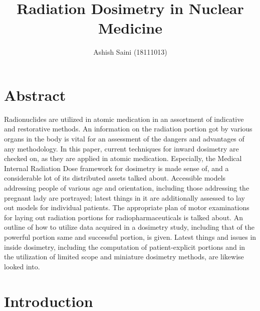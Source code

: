 \documentclass[12pt]{article}
\begin{document}
\title{Radiation Dosimetry in Nuclear Medicine}
\author{Ashish Saini (18111013)}

\maketitle

\section{Abstract} 
Radionuclides are utilized in atomic medication in an assortment of indicative and restorative methods. An information on the radiation portion got by various organs in the body is vital for an assessment of the dangers and advantages of any methodology. In this paper, current techniques for inward dosimetry are checked on, as they are applied in atomic medication. Especially, the Medical Internal Radiation Dose framework for dosimetry is made sense of, and a considerable lot of its distributed assets talked about. Accessible models addressing people of various age and orientation, including those addressing the pregnant lady are portrayed; latest things in it are additionally assessed to lay out models for individual patients. The appropriate plan of motor examinations for laying out radiation portions for radiopharmaceuticals is talked about. An outline of how to utilize data acquired in a dosimetry study, including that of the powerful portion same and successful portion, is given. Latest things and issues in inside dosimetry, including the computation of patient-explicit portions and in the utilization of limited scope and miniature dosimetry methods, are likewise looked into.

\section{Introduction}
\end{document}
